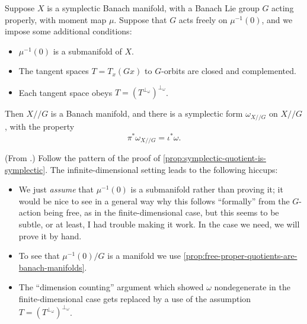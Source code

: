 \documentclass[12pt,letterpaper,reqno]{article}
\numberwithin{equation}{section}
\newcommand{\fg}{{\mathfrak g}}
\newcommand{\kq}{/\!\!/}
\newcommand{\ti}[1]{\textit{#1}}
\DeclareMathOperator{\im}{Im}
\begin{document}
\begin{thm} \label{prop:banach-symplectic-quotient-is-symplectic}
Suppose $X$ is a symplectic Banach manifold, with a Banach Lie group $G$
acting properly, with moment map $\mu$.
Suppose that $G$ acts freely on $\mu^{-1}(0)$, and we impose
some additional conditions:
\begin{itemize}
\item $\mu^{-1}(0)$ is a submanifold of $X$.
\item The tangent
spaces $T = T_x (Gx)$ to $G$-orbits are closed and complemented.
\item Each tangent space obeys $T = (T^{\perp_\omega})^{\perp_\omega}$.
\end{itemize}
Then $X \kq G$ is a Banach manifold, and there is a
symplectic form $\omega_{X \kq G}$ on $X \kq G$, with the
property
\begin{equation}
  \pi^* \omega_{X \kq G} = \iota^* \omega.
\end{equation}
\end{thm}

\begin{pf}

(From \cite{Tumpach2007}.)
Follow the pattern of the proof
of \autoref{prop:symplectic-quotient-is-symplectic}.
The infinite-dimensional setting leads to the following
hiccups:
\begin{itemize}

\item
We just \ti{assume} that $\mu^{-1}(0)$ is a submanifold
rather than proving it; it would be nice to see in a general
way why this follows ``formally'' from the $G$-action being
free, as in the finite-dimensional case, but
this seems to be subtle, or at least, I had trouble
making it work. In the case we need, we will
prove it by hand.

\item To see that $\mu^{-1}(0) / G$ is a manifold
we use \autoref{prop:free-proper-quotients-are-banach-manifolds}.

\item The ``dimension counting'' argument which showed
$\omega$ nondegenerate in the finite-dimensional case
gets replaced by a use of the assumption $T = (T^{\perp_\omega})^{\perp_\omega}$.
\end{itemize}
\end{pf}
\end{document}
